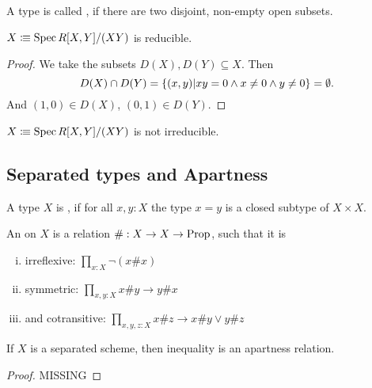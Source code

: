 \begin{definition}
  A type is called , if there are two disjoint, non-empty open subsets.
\end{definition}

\begin{proposition}
  $X\vcentcolon\mspace{-1.2mu}\equiv \operatorname{Spec} R[X,Y]/(XY)$ is reducible.
\end{proposition}

\begin{proof}
  We take the subsets $D(X),D(Y)\subseteq X$.
  Then
  \[ D(X)\cap D(Y)=\{(x,y)\vert xy=0\wedge x\neq 0\wedge y\neq 0\}=\emptyset\rlap{.} \]
  And $(1,0)\in D(X)$, $(0,1)\in D(Y)$.
\end{proof}

\begin{example}
  $X\vcentcolon\mspace{-1.2mu}\equiv \operatorname{Spec} R[X,Y]/(XY)$ is not irreducible.
\end{example}

\subsection{Separated types and Apartness}

\begin{definition}
  A type $X$ is , if for all $x,y:X$
  the type $x=y$ is a closed subtype of $X\times X$.
\end{definition}

\begin{definition}
  An  on $X$ is a relation $\#:X\to X\to \mathrm{Prop}$, such that it is
  \begin{enumerate}[(i)]
  \item irreflexive: $\prod_{x:X}\neg(x \# x)$
  \item symmetric: $\prod_{x,y:X} x\# y \to y\# x$
  \item and cotransitive: $\prod_{x,y,z:X} x\# z \to x\# y \vee y\# z$
  \end{enumerate}
\end{definition}

\begin{proposition}
  \label{separated-inequality-apartness}
  If $X$ is a separated scheme, then inequality is an apartness relation.
\end{proposition}

\begin{proof}
  MISSING
\end{proof}
